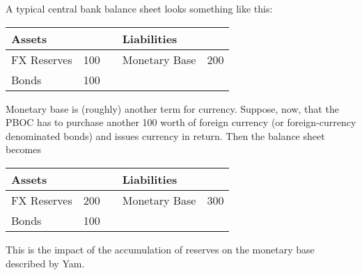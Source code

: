 \documentclass[letterpaper,12pt]{exam}
\begin{document}
\begin{questions}
\begin{solution}
\begin{parts}
\item A typical central bank balance sheet looks something like this:
%
\begin{center}
\begin{tabular}{lrclr}
               Assets  &     &&     Liabilities                     \\
               \hline
               FX Reserves &  100 &&     Monetary Base &  200   \\
               Bonds   & 100 && \\
\end{tabular}
\end{center}
%
Monetary base is (roughly) another term for currency.
Suppose, now, that the PBOC has to purchase another 100 worth of
foreign currency (or foreign-currency denominated bonds)
and issues currency in return.
Then the balance sheet becomes
%
\begin{center}
\begin{tabular}{lrclr}
               Assets  &     &&     Liabilities                     \\
               \hline
               FX Reserves &  200 &&     Monetary Base &  300   \\
               Bonds   & 100 && \\
\end{tabular}
\end{center}
%
This is the impact of the accumulation of reserves on the monetary base described by Yam.



\end{parts}
\end{solution}
\end{questions}
\end{document}
